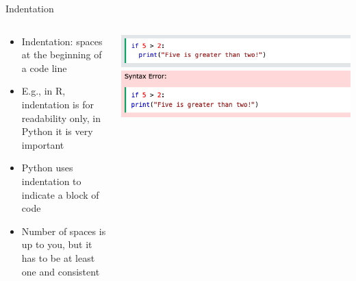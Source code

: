 \documentclass[10pt, aspectratio=169]{beamer}
\begin{document}
{\begin{frame}{Indentation}
  \begin{columns}
\begin{column}{0.5\textwidth}
    \begin{itemize}
        \item Indentation: spaces at the beginning of a code line
        \item E.g., in R, indentation is for readability only, in Python it is very important
        \item Python uses indentation to indicate a block of code
        \item Number of spaces is up to you, but it has to be at least one and consistent
    \end{itemize}
\end{column}
\begin{column}{0.5\textwidth}  %
    \begin{center}
      \includegraphics[scale=.28]{Day 1/Slides/LaTeX files/indentation_1.png}
      \vskip 1cm
      \includegraphics[scale=.28]{Day 1/Slides/LaTeX files/indentation_2.png}
     \end{center}
\end{column}
\end{columns}
    
\end{frame}

}
\end{document}
